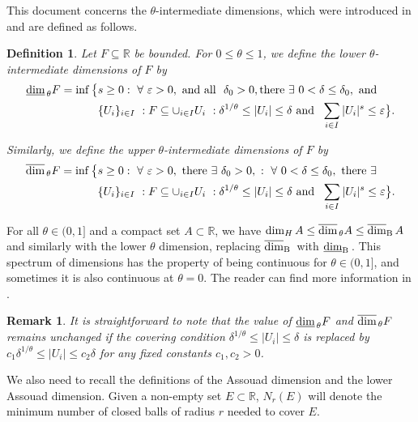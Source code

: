 \documentclass[11pt,reqno,bookmarksnumbered,raiselinks,breaklinks,colorlinks,plainpages]{amsart}
\renewcommand{\epsilon}{\varepsilon}
\newcommand\ubd{\overline{\mbox{\rm dim}}_{\rm B}\,} %
\newcommand\lbd{\underline{\mbox{\rm dim}}_{\rm B}\,} %
\newcommand\da{\underline{\mbox{\rm dim}}_{\,\theta}} %
\newcommand\uda{\overline{\mbox{\rm dim}}_{\,\theta}} %
\newtheorem{defi}[theo]{Definition}
\newtheorem{rmk}[theo]{Remark}
\begin{document}
This document concerns the $\theta$-intermediate dimensions, which were introduced in \cite{FFK} and are defined as follows.

\begin{defi}\label{adef}
Let $F \subseteq \mathbb{R}$ be bounded. For $0 \leq \theta \leq 1$, we define the \emph{lower $\theta$-intermediate dimensions} of $F$ by
\begin{align*}
 \da F =  \inf \big\{& s \geq 0 : \ \forall\ \epsilon >0, \ \text{and all }\ \delta_0>0, \text{there}\ \exists\ 0<\delta\leq \delta_0, \ \text{and } \\
 & \{U_i\}_{i \in I}\  : F \subseteq \cup_{i \in I} U_i \ : \delta^{1/\theta} \leq  |U_i| \leq \delta \ \text{and }\ \sum_{i \in I} |U_i|^s \leq \epsilon  \big\}.
\end{align*}

Similarly, we define the \emph{upper $\theta$-intermediate dimensions} of $F$ by
\begin{align*}
\uda F =  \inf \big\{& s \geq 0 : \ \forall\ \epsilon >0, \ \text{there}\ \exists\ \delta_0>0, \ : \ \forall\ 0<\delta\leq \delta_0, \ \text{there}\ \exists \\
 & \{U_i\}_{i \in I}\  : F \subseteq \cup_{i \in I} U_i \ : \delta^{1/\theta} \leq  |U_i| \leq \delta \ \text{and }\ \sum_{i \in I} |U_i|^s \leq \epsilon  \big\}.
\end{align*}
\end{defi}

For all $\theta \in (0,1]$ and a compact set $A \subset \mathbb{R}$, we have $\dim_H A \leq \uda A \leq \ubd A$ and similarly with the lower $\theta$ dimension, replacing $\ubd$ with $\lbd$. This spectrum of dimensions has the property of being continuous for $\theta \in (0,1]$, and sometimes it is also continuous at $\theta=0$. The reader can find more information in \cite{FFK}.

\begin{rmk}
    It is straightforward to note that the value of $\da F$ and $\uda F$ remains unchanged if the covering condition $\delta^{1/\theta} \le |U_i| \le \delta$ is replaced by $c_1\delta^{1/\theta} \le |U_i| \le c_2\delta$ for any fixed constants $c_1, c_2 > 0$.
\end{rmk}


We also need to recall the definitions of the Assouad dimension and the lower Assouad dimension. Given a non-empty set $E \subset \mathbb{R}$, $N_r(E)$ will denote the minimum number of closed balls of radius $r$ needed to cover $E$.
\end{document}
